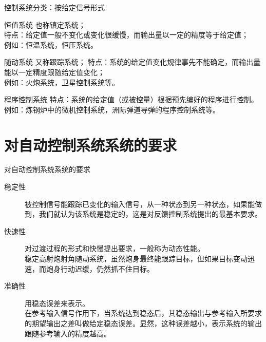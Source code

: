 \documentclass[handout,cjkutf8,table,aspectratio=1610]{beamer} %
\begin{document}
\begin{frame}{控制系统分类：按给定信号形式}
\begin{block}{恒值系统}
也称镇定系统；\\
\alert{特点：}给定值一般不变化或变化很缓慢，而输出量以一定的精度等于给定值；\\
\alert{例如：}恒温系统，恒压系统。
\end{block}
\begin{block}{随动系统}
又称跟踪系统；
\alert{特点：}系统的给定值变化规律事先不能确定，而输出量能以一定精度跟随给定值变化；\\
\alert{例如：}火炮系统，卫星控制系统等。
\end{block}
\begin{block}{程序控制系统}
\alert{特点：}系统的给定值（或被控量）根据预先编好的程序进行控制。\\
\alert{例如：}炼钢炉中的微机控制系统，洲际弹道导弹的程序控制系统等。
\end{block}
\end{frame}

\section{对自动控制系统系统的要求}
\begin{frame}{对自动控制系统系统的要求}
\begin{description}
\item[稳定性]被控制信号能跟踪已变化的输入信号，从一种状态到另一种状态，如果能做到，我们就认为该系统是稳定的，这是对反馈控制系统提出的最基本要求。 
\item[快速性]对过渡过程的形式和快慢提出要求，一般称为动态性能。\\
稳定高射炮射角随动系统，虽然炮身最终能跟踪目标，但如果目标变动迅速，而炮身行动迟缓，仍然抓不住目标。
\item[准确性]用稳态误差来表示。\\
在参考输入信号作用下，当系统达到稳态后，其稳态输出与参考输入所要求的期望输出之差叫做给定稳态误差。显然，这种误差越小，表示系统的输出跟随参考输入的精度越高。
\end{description}
\end{frame}
\end{document}
